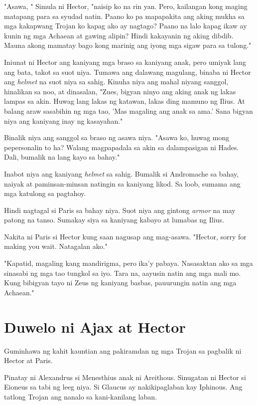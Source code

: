 \documentclass[12pt,letterpaper]{report}
\begin{document}
"Asawa, " Simula ni Hector, "naisip ko na rin yan. Pero, kailangan kong maging matapang para sa syudad natin. Paano ko pa mapapakita ang aking mukha sa mga kakapwang Trojan ko kapag ako ay nagtago? Paano na lalo kapag ikaw ay kunin ng mga Achaean at gawing alipin? Hindi kakayanin ng aking dibdib. Mauna akong mamatay bago kong marinig ang iyong mga sigaw para sa tulong."

Iniunat ni Hector ang kaniyang mga braso sa kaniyang anak, pero umiyak lang ang bata, takot sa suot niya. Tumawa ang dalawang magulang, binaba ni Hector ang \textit{helmet} na suot niya sa sahig. Kinuha niya ang mahal niyang sanggol, hinalikan sa noo, at dinasalan, "Zues, bigyan ninyo ang aking anak ng lakas lampas sa akin. Huwag lang lakas ng katawan, lakas ding mamuno ng Ilius. At balang araw sasabihin ng mga tao, 'Mas magaling ang anak sa ama.' Sana bigyan niya ang kaniyang inay ng kasayahan."

Binalik niya ang sanggol sa braso ng asawa niya. "Asawa ko, huwag mong pepersonalin to ha? Walang magpapadala sa akin sa dalampasigan ni Hades. Dali, bumalik na lang kayo sa bahay."

Inabot niya ang kaniyang \textit{helmet} sa sahig. Bumalik si Andromache sa bahay, naiyak at paminsan-minsan natingin sa kaniyang likod. Sa loob, sumama ang mga katulong sa pagtahoy.

Hindi nagtagal si Paris sa bahay niya. Suot niya ang gintong \textit{armor} na may patong na tanso. Sumakay siya sa kaniyang kabayo at lumabas ng Ilius.

Nakita ni Paris si Hector kung saan nagusap ang mag-asawa. "Hector, sorry for making you wait. Natagalan ako."

"Kapatid, magaling kang mandirigma, pero ika'y pabaya. Nasasaktan ako sa mga sinasabi ng mga tao tungkol sa iyo. Tara na, aayusin natin ang mga mali mo. Kung bibigyan tayo ni Zeus ng kaniyang basbas, pauurungin natin ang mga Achaean."

\pagebreak
\chapter{Duwelo ni Ajax at Hector}
Guminhawa ng kahit kauntian ang pakiramdan ng mga Trojan sa pagbalik ni Hector at Paris.

Pinatay ni Alexandrus si Menesthius anak ni Areithous. Sinugatan ni Hector si Eioneus sa tabi ng leeg niya. Si Glaucus ay nakikipaglaban kay Iphinous. Ang tatlong Trojan ang nanalo sa kani-kanilang laban.
\end{document}
